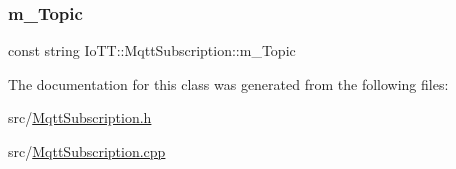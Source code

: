 \subsubsection{\texorpdfstring{m\+\_\+\+Topic}{m\_Topic}}
{\footnotesize\ttfamily const string Io\+T\+T\+::\+Mqtt\+Subscription\+::m\+\_\+\+Topic\hspace{0.3cm}{\ttfamily [protected]}}



The documentation for this class was generated from the following files\+:\begin{DoxyCompactItemize}
\item 
src/\hyperlink{MqttSubscription_8h}{Mqtt\+Subscription.\+h}\item 
src/\hyperlink{MqttSubscription_8cpp}{Mqtt\+Subscription.\+cpp}\end{DoxyCompactItemize}
